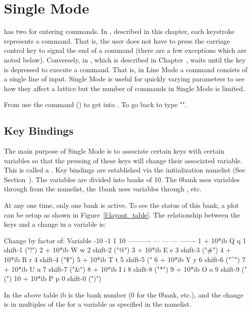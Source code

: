 \chapter{Single Mode}
\label{c:single}

\tao has two  for entering commands. In ,
described in this chapter, each keystroke represents a command.  That
is, the user does not have to press the carriage control key to signal
the end of a command (there are a few exceptions which are noted
below). Conversely, in , which is described in
Chapter~, \tao waits until the  key is
depressed to execute a command. That is, in Line Mode a command
consists of a single line of input.  Single Mode is useful for quickly
varying parameters to see how they affect a lattice but the number of
commands in Single Mode is limited.

From  use the  command ()
to get into . To go back to  type
"".

\section{Key Bindings}
\label{s:key_bind}

The main purpose of Single Mode is to associate certain keys with
certain variables so that the pressing of these keys will change their
associated variable. This is called a .  Key bindings
are established via the  initialization namelist (See
Section~). The variables are divided into banks of
10. The 0\Th bank uses variables  through  from
the  namelist, the 1\St bank uses variables
 through , etc.  

At any one time, only one bank is active. To see the status of this
bank, a  plot can be setup as shown in
Figure~\ref{f:layout_table}. The relationship between the keys and a
change in a variable is:
\begin{example}
                 Change by factor of:          
     Variable    -10  -1    1     10
   ----------    ---  ---  ---  -------
    1 + 10*ib     Q    q    1   shift-1   ("!")
    2 + 10*ib     W    w    2   shift-2   ("@")
    3 + 10*ib     E    e    3   shift-3   ("\#")
    4 + 10*ib     R    r    4   shift-4   ("\$")
    5 + 10*ib     T    t    5   shift-5   ("%
    6 + 10*ib     Y    y    6   shift-6   ("^")
    7 + 10*ib     U    u    7   shift-7   ("\&")
    8 + 10*ib     I    i    8   shift-8   ("*")
    9 + 10*ib     O    o    9   shift-9   ("(")
   10 + 10*ib     P    p    0   shift-0   (")")
\end{example}
In the above table ib is the bank number (0 for the 0\Th bank, etc.),
and the change is in multiples of the  for a variable as
specified in the  namelist. 

